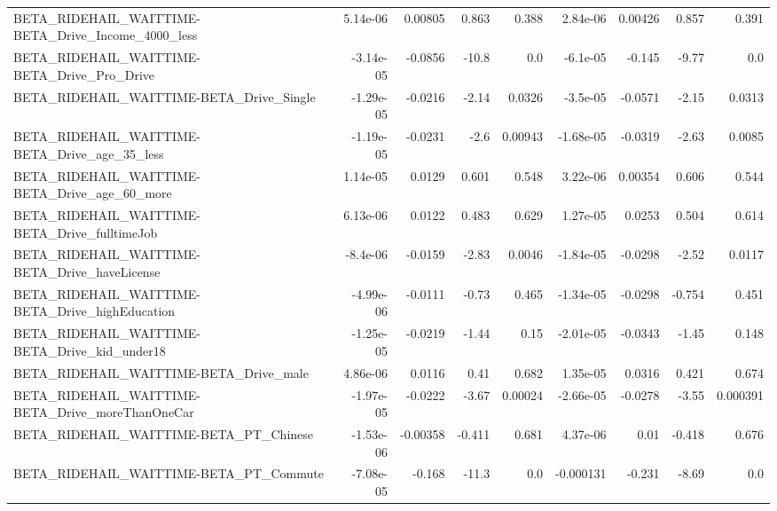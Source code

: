 \begin{tabular}{lrrrrrrrr}
BETA\_RIDEHAIL\_WAITTIME-BETA\_Drive\_Income\_4000\_less &    5.14e-06 &      0.00805 &     0.863 &    0.388 &   2.84e-06 &     0.00426 &        0.857 &         0.391 \\
BETA\_RIDEHAIL\_WAITTIME-BETA\_Drive\_Pro\_Drive        &   -3.14e-05 &      -0.0856 &     -10.8 &      0.0 &   -6.1e-05 &      -0.145 &        -9.77 &           0.0 \\
BETA\_RIDEHAIL\_WAITTIME-BETA\_Drive\_Single           &   -1.29e-05 &      -0.0216 &     -2.14 &   0.0326 &   -3.5e-05 &     -0.0571 &        -2.15 &        0.0313 \\
BETA\_RIDEHAIL\_WAITTIME-BETA\_Drive\_age\_35\_less      &   -1.19e-05 &      -0.0231 &      -2.6 &  0.00943 &  -1.68e-05 &     -0.0319 &        -2.63 &        0.0085 \\
BETA\_RIDEHAIL\_WAITTIME-BETA\_Drive\_age\_60\_more      &    1.14e-05 &       0.0129 &     0.601 &    0.548 &   3.22e-06 &     0.00354 &        0.606 &         0.544 \\
BETA\_RIDEHAIL\_WAITTIME-BETA\_Drive\_fulltimeJob      &    6.13e-06 &       0.0122 &     0.483 &    0.629 &   1.27e-05 &      0.0253 &        0.504 &         0.614 \\
BETA\_RIDEHAIL\_WAITTIME-BETA\_Drive\_haveLicense      &    -8.4e-06 &      -0.0159 &     -2.83 &   0.0046 &  -1.84e-05 &     -0.0298 &        -2.52 &        0.0117 \\
BETA\_RIDEHAIL\_WAITTIME-BETA\_Drive\_highEducation    &   -4.99e-06 &      -0.0111 &     -0.73 &    0.465 &  -1.34e-05 &     -0.0298 &       -0.754 &         0.451 \\
BETA\_RIDEHAIL\_WAITTIME-BETA\_Drive\_kid\_under18      &   -1.25e-05 &      -0.0219 &     -1.44 &     0.15 &  -2.01e-05 &     -0.0343 &        -1.45 &         0.148 \\
BETA\_RIDEHAIL\_WAITTIME-BETA\_Drive\_male             &    4.86e-06 &       0.0116 &      0.41 &    0.682 &   1.35e-05 &      0.0316 &        0.421 &         0.674 \\
BETA\_RIDEHAIL\_WAITTIME-BETA\_Drive\_moreThanOneCar   &   -1.97e-05 &      -0.0222 &     -3.67 &  0.00024 &  -2.66e-05 &     -0.0278 &        -3.55 &      0.000391 \\
BETA\_RIDEHAIL\_WAITTIME-BETA\_PT\_Chinese             &   -1.53e-06 &     -0.00358 &    -0.411 &    0.681 &   4.37e-06 &        0.01 &       -0.418 &         0.676 \\
BETA\_RIDEHAIL\_WAITTIME-BETA\_PT\_Commute             &   -7.08e-05 &       -0.168 &     -11.3 &      0.0 &  -0.000131 &      -0.231 &        -8.69 &           0.0 \\

\end{tabular}
